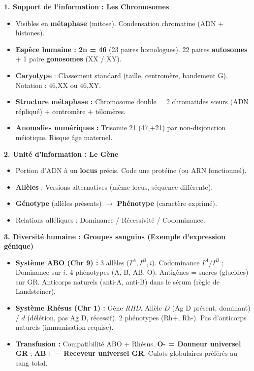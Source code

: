 \documentclass[11pt]{article}
\begin{document}
\begin{aretenir}
\textbf{1. Support de l'information : Les Chromosomes}
\begin{itemize}
    \item Visibles en \textbf{métaphase} (mitose). Condensation chromatine (ADN + histones).
    \item \textbf{Espèce humaine : 2n = 46} (23 paires homologues). 22 paires \textbf{autosomes} + 1 paire \textbf{gonosomes} (XX / XY).
    \item \textbf{Caryotype} : Classement standard (taille, centromère, bandement G). Notation : 46,XX ou 46,XY.
    \item \textbf{Structure métaphase :} Chromosome double = 2 chromatides sœurs (ADN répliqué) + centromère + télomères.
    \item \textbf{Anomalies numériques :} Trisomie 21 (47,+21) par non-disjonction méiotique. Risque âge maternel.
\end{itemize}

\textbf{2. Unité d'information : Le Gène}
\begin{itemize}
    \item Portion d'ADN à un \textbf{locus} précis. Code une protéine (ou ARN fonctionnel).
    \item \textbf{Allèles} : Versions alternatives (même locus, séquence différente).
    \item \textbf{Génotype} (allèles présents) $\rightarrow$ \textbf{Phénotype} (caractère exprimé).
    \item Relations alléliques : Dominance / Récessivité / Codominance.
\end{itemize}

\textbf{3. Diversité humaine : Groupes sanguins (Exemple d'expression génique)}
\begin{itemize}
    \item \textbf{Système ABO (Chr 9) :} 3 allèles ($I^A, I^B, i$). Codominance $I^A/I^B$ ; Dominance sur $i$. 4 phénotypes (A, B, AB, O). Antigènes = sucres (glucides) sur GR. Anticorps naturels (anti-A, anti-B) dans le sérum (règle de Landsteiner).
    \item \textbf{Système Rhésus (Chr 1) :} Gène \emph{RHD}. Allèle $D$ (Ag D présent, dominant) / $d$ (délétion, pas Ag D, récessif). 2 phénotypes (Rh+, Rh-). Pas d'anticorps naturels (immunisation requise).
    \item \textbf{Transfusion :} Compatibilité ABO + Rhésus. \textbf{O- = Donneur universel GR} ; \textbf{AB+ = Receveur universel GR}. Culots globulaires préférés au sang total.
\end{itemize}


\end{aretenir}
\end{document}
